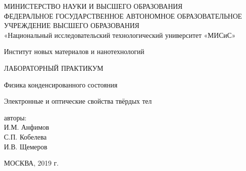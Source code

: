 \thispagestyle{empty}

\begin{center}
\MakeUppercase{министерство науки и высшего образования} \\
\MakeUppercase{Федеральное государственное автономное образовательное учреждение высшего образования} \\
«Национальный исследовательский технологический университет «МИСиС»

Институт новых материалов и нанотехнологий

\vspace{2cm}

ЛАБОРАТОРНЫЙ ПРАКТИКУМ

Физика конденсированного состояния

Электронные и оптические свойства твёрдых тел

\vspace{3cm}

авторы: \\
И.М. Анфимов \\
С.П. Кобелева \\
И.В. Щемеров

\vspace{3cm}

МОСКВА, 2019 г.
\end{center}

